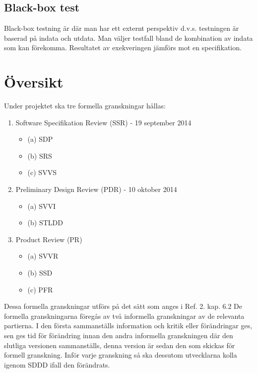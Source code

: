 \documentclass[a4paper]{article}
\begin{document}
\subsection{Black-box test}

Black-box testning är där man har ett externt perspektiv d.v.s. testningen är baserad på indata och utdata. Man väljer testfall bland de kombination av indata som kan förekomma. Resultatet av exekveringen jämförs mot en specifikation.


\section{Översikt}

Under projektet ska tre formella granskningar hållas:

\begin{enumerate}


\item Software Specifikation Review (SSR) - 19 september 2014
\begin{itemize}
\item [](a) SDP
\item [](b) SRS
\item [](c) SVVS
\end{itemize}


\item Preliminary Design Review (PDR) - 10 oktober 2014
\begin{itemize}
\item [](a) SVVI
\item [](b) STLDD
\end{itemize}


\item Product Review (PR)
\begin{itemize}
\item [](a) SVVR
\item [](b) SSD
\item [](c) PFR
\end{itemize}


\end{enumerate}

Dessa formella granskningar utförs på det sätt som anges i Ref. 2. kap. 6.2 De formella granskningarna föregås av två informella granskningar av de relevanta partierna. I den första sammanställs information och kritik eller förändringar ges, sen ges tid för förändring innan den andra informella granskningen där den slutliga versionen sammanställs, denna version är sedan den som skickas för formell granskning. Inför varje granskning så ska dessutom utvecklarna kolla igenom SDDD ifall den förändrats.
\end{document}
